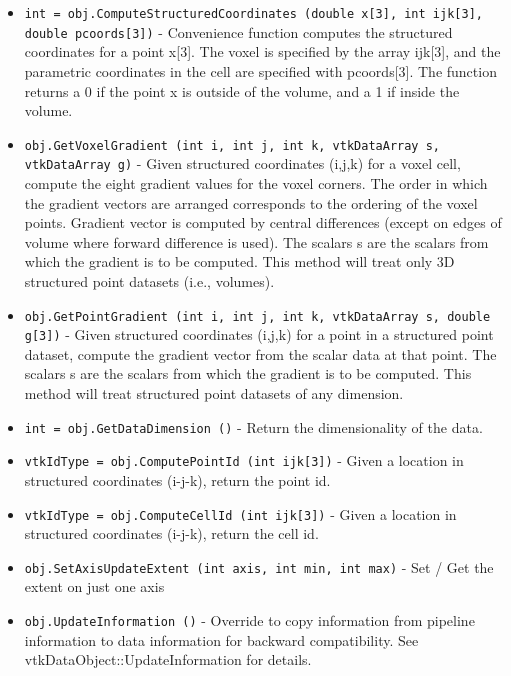 \begin{itemize}
\item  \verb|int = obj.ComputeStructuredCoordinates (double x[3], int ijk[3], double pcoords[3])| -  Convenience function computes the structured coordinates for a point x[3].
 The voxel is specified by the array ijk[3], and the parametric coordinates
 in the cell are specified with pcoords[3]. The function returns a 0 if the
 point x is outside of the volume, and a 1 if inside the volume.

\item  \verb|obj.GetVoxelGradient (int i, int j, int k, vtkDataArray s, vtkDataArray g)| -  Given structured coordinates (i,j,k) for a voxel cell, compute the eight
 gradient values for the voxel corners. The order in which the gradient
 vectors are arranged corresponds to the ordering of the voxel points.
 Gradient vector is computed by central differences (except on edges of
 volume where forward difference is used). The scalars s are the scalars
 from which the gradient is to be computed. This method will treat
 only 3D structured point datasets (i.e., volumes).

\item  \verb|obj.GetPointGradient (int i, int j, int k, vtkDataArray s, double g[3])| -  Given structured coordinates (i,j,k) for a point in a structured point
 dataset, compute the gradient vector from the scalar data at that point.
 The scalars s are the scalars from which the gradient is to be computed.
 This method will treat structured point datasets of any dimension.

\item  \verb|int = obj.GetDataDimension ()| -  Return the dimensionality of the data.

\item  \verb|vtkIdType = obj.ComputePointId (int ijk[3])| -  Given a location in structured coordinates (i-j-k), return the point id.

\item  \verb|vtkIdType = obj.ComputeCellId (int ijk[3])| -  Given a location in structured coordinates (i-j-k), return the cell id.

\item  \verb|obj.SetAxisUpdateExtent (int axis, int min, int max)| -  Set / Get the extent on just one axis

\item  \verb|obj.UpdateInformation ()| -  Override to copy information from pipeline information to data
 information for backward compatibility.  See
 vtkDataObject::UpdateInformation for details.


\end{itemize}
